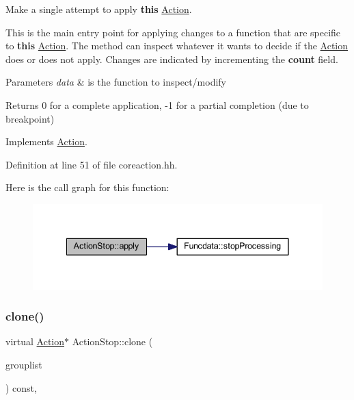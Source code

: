 Make a single attempt to apply {\bfseries{this}} \mbox{\hyperlink{class_action}{Action}}. 

This is the main entry point for applying changes to a function that are specific to {\bfseries{this}} \mbox{\hyperlink{class_action}{Action}}. The method can inspect whatever it wants to decide if the \mbox{\hyperlink{class_action}{Action}} does or does not apply. Changes are indicated by incrementing the {\bfseries{count}} field. 
\begin{DoxyParams}{Parameters}
{\em data} & is the function to inspect/modify \\
\hline
\end{DoxyParams}
\begin{DoxyReturn}{Returns}
0 for a complete application, -\/1 for a partial completion (due to breakpoint) 
\end{DoxyReturn}


Implements \mbox{\hyperlink{class_action_aac1c3999d6c685b15f5d9765a4d04173}{Action}}.



Definition at line 51 of file coreaction.\+hh.

Here is the call graph for this function\+:
\nopagebreak
\begin{figure}[H]
\begin{center}
\leavevmode
\includegraphics[width=341pt]{class_action_stop_a2d539e33984e982dad5cc306141c9787_cgraph}
\end{center}
\end{figure}
\mbox{\label{class_action_stop_a3b262cbd121ab1595178c1248ca409a3}} 
\subsubsection{\texorpdfstring{clone()}{clone()}}
{\footnotesize\ttfamily virtual \mbox{\hyperlink{class_action}{Action}}$\ast$ Action\+Stop\+::clone (\begin{DoxyParamCaption}\item[{const \mbox{\hyperlink{class_action_group_list}{Action\+Group\+List}} \&}]{grouplist }\end{DoxyParamCaption}) const\hspace{0.3cm}{\ttfamily [inline]}, {\ttfamily [virtual]}}



